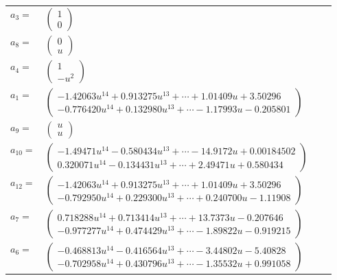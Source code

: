 \documentclass[1p]{elsarticle_modified}
\theoremstyle{definition}
\begin{document}
\begin{tabular}{m{7pt} m{180pt} m{7pt} m{180pt} }
\flushright $a_{3}=$&$\begin{pmatrix}1\\0\end{pmatrix}$ \\
\flushright $a_{8}=$&$\begin{pmatrix}0\\u\end{pmatrix}$ \\
\flushright $a_{4}=$&$\begin{pmatrix}1\\- u^2\end{pmatrix}$ \\
\flushright $a_{1}=$&$\begin{pmatrix}-1.42063 u^{14}+0.913275 u^{13}+\cdots+1.01409 u+3.50296\\-0.776420 u^{14}+0.132980 u^{13}+\cdots-1.17993 u-0.205801\end{pmatrix}$ \\
\flushright $a_{9}=$&$\begin{pmatrix}u\\u\end{pmatrix}$ \\
\flushright $a_{10}=$&$\begin{pmatrix}-1.49471 u^{14}-0.580434 u^{13}+\cdots-14.9172 u+0.00184502\\0.320071 u^{14}-0.134431 u^{13}+\cdots+2.49471 u+0.580434\end{pmatrix}$ \\
\flushright $a_{12}=$&$\begin{pmatrix}-1.42063 u^{14}+0.913275 u^{13}+\cdots+1.01409 u+3.50296\\-0.792950 u^{14}+0.229300 u^{13}+\cdots+0.240700 u-1.11908\end{pmatrix}$ \\
\flushright $a_{7}=$&$\begin{pmatrix}0.718288 u^{14}+0.713414 u^{13}+\cdots+13.7373 u-0.207646\\-0.977277 u^{14}+0.474429 u^{13}+\cdots-1.89822 u-0.919215\end{pmatrix}$ \\
\flushright $a_{6}=$&$\begin{pmatrix}-0.468813 u^{14}-0.416564 u^{13}+\cdots-3.44802 u-5.40828\\-0.702958 u^{14}+0.430796 u^{13}+\cdots-1.35532 u+0.991058\end{pmatrix}$ \\

\end{tabular}
\end{document}
